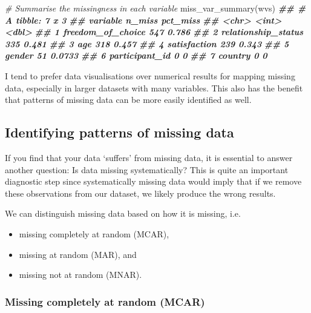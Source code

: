 \documentclass[
]{book}
\newenvironment{Shaded}{\begin{snugshade}}{\end{snugshade}}
\newcommand{\CommentTok}[1]{\textcolor[rgb]{0.56,0.35,0.01}{\textit{#1}}}
\newcommand{\DocumentationTok}[1]{\textcolor[rgb]{0.56,0.35,0.01}{\textbf{\textit{#1}}}}
\newcommand{\FunctionTok}[1]{\textcolor[rgb]{0.00,0.00,0.00}{#1}}
\newcommand{\NormalTok}[1]{#1}
\begin{document}
\begin{Shaded}
\begin{Highlighting}[]
\CommentTok{\# Summarise the missingness in each variable}
\FunctionTok{miss\_var\_summary}\NormalTok{(wvs)}
\DocumentationTok{\#\# \# A tibble: 7 x 3}
\DocumentationTok{\#\#   variable            n\_miss pct\_miss}
\DocumentationTok{\#\#   \textless{}chr\textgreater{}                \textless{}int\textgreater{}    \textless{}dbl\textgreater{}}
\DocumentationTok{\#\# 1 freedom\_of\_choice      547   0.786 }
\DocumentationTok{\#\# 2 relationship\_status    335   0.481 }
\DocumentationTok{\#\# 3 age                    318   0.457 }
\DocumentationTok{\#\# 4 satisfaction           239   0.343 }
\DocumentationTok{\#\# 5 gender                  51   0.0733}
\DocumentationTok{\#\# 6 participant\_id           0   0     }
\DocumentationTok{\#\# 7 country                  0   0}
\end{Highlighting}
\end{Shaded}

I tend to prefer data visualisations over numerical results for mapping missing data, especially in larger datasets with many variables. This also has the benefit that patterns of missing data can be more easily identified as well.

\hypertarget{patterns-of-missing-data}{%
\subsection{Identifying patterns of missing data}\label{patterns-of-missing-data}}

If you find that your data `suffers' from missing data, it is essential to answer another question: Is data missing systematically? This is quite an important diagnostic step since systematically missing data would imply that if we remove these observations from our dataset, we likely produce the wrong results.

We can distinguish missing data based on how it is missing, i.e.

\begin{itemize}
\item
  missing completely at random (MCAR),
\item
  missing at random (MAR), and
\item
  missing not at random (MNAR). \citep{rubin-1976}
\end{itemize}

\hypertarget{missing-completetly-at-random-mcar}{%
\subsubsection{Missing completely at random (MCAR)}\label{missing-completetly-at-random-mcar}}
\end{document}
